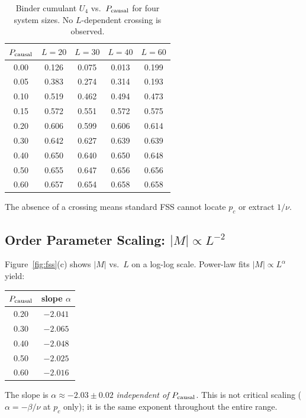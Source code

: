 \documentclass[12pt,a4paper]{article}
\begin{document}
\begin{table}[h]
\centering
\caption{Binder cumulant $U_4$ vs.\ $P_{\rm causal}$ for four system sizes.
No $L$-dependent crossing is observed.}
\label{tab:u4}
\begin{tabular}{ccccc}
\toprule
$P_{\rm causal}$ & $L=20$ & $L=30$ & $L=40$ & $L=60$ \\
\midrule
0.00 & 0.126 & 0.075 & 0.013 & 0.199 \\
0.05 & 0.383 & 0.274 & 0.314 & 0.193 \\
0.10 & 0.519 & 0.462 & 0.494 & 0.473 \\
0.15 & 0.572 & 0.551 & 0.572 & 0.575 \\
0.20 & 0.606 & 0.599 & 0.606 & 0.614 \\
0.30 & 0.642 & 0.627 & 0.639 & 0.639 \\
0.40 & 0.650 & 0.640 & 0.650 & 0.648 \\
0.50 & 0.655 & 0.647 & 0.656 & 0.656 \\
0.60 & 0.657 & 0.654 & 0.658 & 0.658 \\
\bottomrule
\end{tabular}
\end{table}

The absence of a crossing means standard FSS cannot locate $p_c$ or extract $1/\nu$.

\subsection{Order Parameter Scaling: $|M| \propto L^{-2}$}

Figure~\ref{fig:fss}(c) shows $|M|$ vs.\ $L$ on a log-log scale.
Power-law fits $|M| \propto L^\alpha$ yield:

\begin{center}
\begin{tabular}{cc}
\toprule
$P_{\rm causal}$ & slope $\alpha$ \\
\midrule
0.20 & $-2.041$ \\
0.30 & $-2.065$ \\
0.40 & $-2.048$ \\
0.50 & $-2.025$ \\
0.60 & $-2.016$ \\
\bottomrule
\end{tabular}
\end{center}

The slope is $\alpha \approx -2.03 \pm 0.02$ \emph{independent of $P_{\rm causal}$}.
This is not critical scaling ($\alpha = -\beta/\nu$ at $p_c$ only);
it is the same exponent throughout the entire range.
\end{document}
